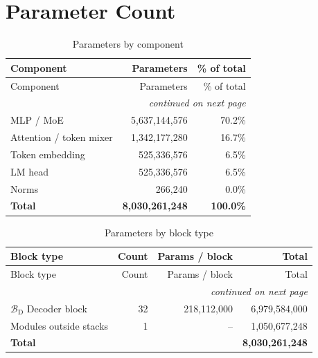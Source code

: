 \documentclass[10pt,a4paper]{article}
\theoremstyle{definition}
\begin{document}
\section{Parameter Count}
\begin{longtable}{lrr}
\caption{Parameters by component}\\
\toprule
Component & Parameters & \% of total \\
\midrule
\endfirsthead
\toprule
Component & Parameters & \% of total \\
\midrule
\endhead
\midrule \multicolumn{3}{r}{\textit{continued on next page}} \\
\endfoot
\bottomrule
\endlastfoot
MLP / MoE & 5,637,144,576 & 70.2\% \\
Attention / token mixer & 1,342,177,280 & 16.7\% \\
Token embedding & 525,336,576 & 6.5\% \\
LM head & 525,336,576 & 6.5\% \\
Norms & 266,240 & 0.0\% \\
\midrule \textbf{Total} & \textbf{8,030,261,248} & \textbf{100.0\%} \\
\end{longtable}
\begin{longtable}{p{8cm}rrr}
\caption{Parameters by block type}\\
\toprule
Block type & Count & Params / block & Total \\
\midrule
\endfirsthead
\toprule
Block type & Count & Params / block & Total \\
\midrule
\endhead
\midrule \multicolumn{4}{r}{\textit{continued on next page}} \\
\endfoot
\bottomrule
\endlastfoot
$\mathcal{B}_{\mathrm{D}}$ Decoder block & 32 & 218,112,000 & 6,979,584,000 \\
Modules outside stacks & 1 & -- & 1,050,677,248 \\
\midrule \textbf{Total} & & & \textbf{8,030,261,248} \\
\end{longtable}
\end{document}
